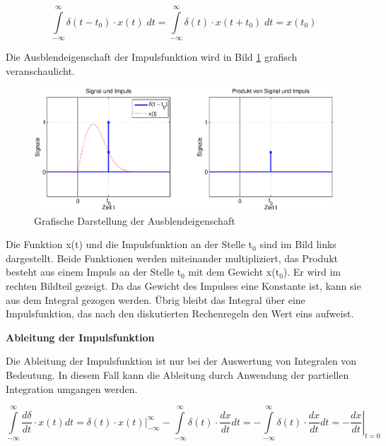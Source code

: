 \begin{equation}\label{eq:onefourtyseven}
\int\limits _{-\infty }^{\infty }\delta \left(t-t_{0} \right)\cdot x\left(t\right)\;dt =\int\limits _{-\infty }^{\infty }\delta \left(t\right)\cdot x\left(t+t_{0} \right)\;dt =x\left(t_{0} \right)
\end{equation}

\noindent Die Ausblendeigenschaft der Impulsfunktion wird in Bild \ref{fig:twoAusblendeigenschaftImpulsfunktion} grafisch veranschaulicht. 

\begin{figure}[H]
  \centerline{\includegraphics[width=1\textwidth]{Kapitel1/Bilder/image13}}
  \caption{Grafische Darstellung der Ausblendeigenschaft}
  \label{fig:twoAusblendeigenschaftImpulsfunktion}
\end{figure}

\noindent 

\noindent Die Funktion x(t) und die Impulsfunktion an der Stelle t${}_{0}$ sind im Bild links dargestellt. Beide Funktionen werden miteinander multipliziert, das Produkt besteht aus einem Impuls an der Stelle t${}_{0}$ mit dem Gewicht x(t${}_{0}$). Er wird im rechten Bildteil gezeigt. Da das Gewicht des Impulses eine Konstante ist, kann sie aus dem Integral gezogen werden. \"{U}brig bleibt das Integral \"{u}ber eine Impulsfunktion, das nach den diskutierten Rechenregeln den Wert eins aufweist.
\bigskip

{\selectfont
\noindent\textbf{Ableitung der Impulsfunktion}} \smallskip

\noindent Die Ableitung der Impulsfunktion ist nur bei der Auswertung von Integralen von Bedeutung. In diesem Fall kann die Ableitung durch Anwendung der partiellen Integration umgangen werden.

\begin{equation}\label{eq:onefourtyeight}
\int\limits _{-\infty }^{\infty }\dfrac{d\delta }{dt} \cdot x(t) dt = \delta (t) \cdot x(t)|_{-\infty }^{\infty } -\int\limits _{-\infty }^{\infty }\delta (t)\cdot \dfrac{dx}{dt} dt =-\int\limits _{-\infty }^{\infty }\delta (t)\cdot \dfrac{dx}{dt} dt = -\left. \dfrac{dx}{dt} \right|_{t=0}
\end{equation}

